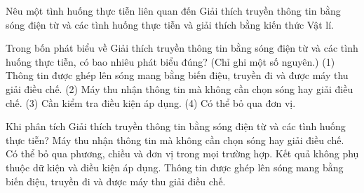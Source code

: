 \begin{bt}
Nêu một tình huống thực tiễn liên quan đến Giải thích truyền thông tin bằng sóng điện từ và các tình huống thực tiễn và giải thích bằng kiến thức Vật lí.
\end{bt}

\begin{ex}
Trong bốn phát biểu về Giải thích truyền thông tin bằng sóng điện từ và các tình huống thực tiễn, có bao nhiêu phát biểu đúng? (Chỉ ghi một số nguyên.) (1) Thông tin được ghép lên sóng mang bằng biến điệu, truyền đi và được máy thu giải điều chế. (2) Máy thu nhận thông tin mà không cần chọn sóng hay giải điều chế. (3) Cần kiểm tra điều kiện áp dụng. (4) Có thể bỏ qua đơn vị.
\end{ex}

\begin{ex}
Khi phân tích Giải thích truyền thông tin bằng sóng điện từ và các tình huống thực tiễn?
\choice
{Máy thu nhận thông tin mà không cần chọn sóng hay giải điều chế.}
{Có thể bỏ qua phương, chiều và đơn vị trong mọi trường hợp.}
{Kết quả không phụ thuộc dữ kiện và điều kiện áp dụng.}
{\True Thông tin được ghép lên sóng mang bằng biến điệu, truyền đi và được máy thu giải điều chế.}
\end{ex}

